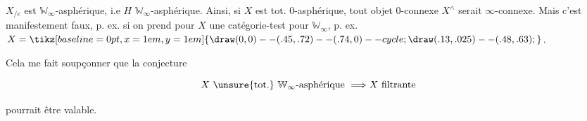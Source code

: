 
$X_{/e}$ est $\mathbb W_\infty$-asphérique, i.e $H$ $\mathbb W_\infty$-asphérique. Ainsi, si $X$ est tot. $0$-asphérique, tout objet $0$-connexe  $X^\wedge$ serait $\infty$-connexe. Mais c'est manifestement faux, p. ex. si on prend pour $X$ une catégorie-test pour $\mathbb W_\infty$, p. ex. $X=\mathord{\tikz[baseline=0pt,x=1em,y=1em]{\draw (0,0)--(.45,.72)--(.74,0)--cycle; \draw (.13,.025)--(.48,.63);}}$.

Cela me fait soupçonner que la conjecture

\[
X\ \text{\unsure{tot.}}\ \mathbb W_\infty\text{-asphérique}\ \Longrightarrow X\ \text{filtrante}
\]

pourrait être valable.

